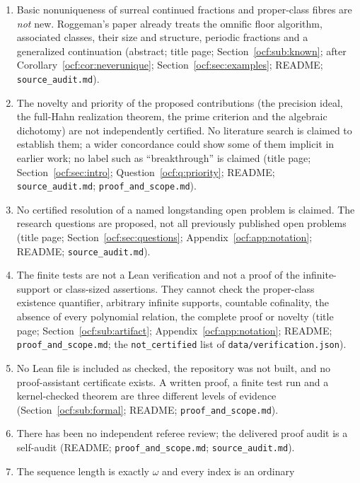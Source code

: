 \documentclass[11pt,a4paper]{article}
\numberwithin{equation}{section}
\theoremstyle{definition}
\theoremstyle{remark}
\newcommand{\rpath}[1]{\nolinkurl{#1}}%
\begin{document}
\begin{enumerate}[label=S\arabic*.,leftmargin=2.6em,itemsep=2pt]
\item Basic nonuniqueness of surreal continued fractions and proper-class
fibres are \emph{not} new. Roggeman's paper \cite{Roggeman} already treats
the omnific floor algorithm, associated classes, their size and structure,
periodic fractions and a generalized continuation (abstract; title page;
Section~\ref{ocf:sub:known}; after Corollary~\ref{ocf:cor:neverunique};
Section~\ref{ocf:sec:examples}; README; \rpath{source\_audit.md}).
\item The novelty and priority of the proposed contributions (the precision
ideal, the full-Hahn realization theorem, the prime criterion and the
algebraic dichotomy) are not independently certified. No literature search
is claimed to establish them; a wider concordance could show some of them
implicit in earlier work; no label such as ``breakthrough'' is claimed
(title page; Section~\ref{ocf:sec:intro}; Question~\ref{ocf:q:priority};
README; \rpath{source\_audit.md}; \rpath{proof\_and\_scope.md}).
\item No certified resolution of a named longstanding open problem is
claimed. The research questions are proposed, not all previously
published open problems (title page; Section~\ref{ocf:sec:questions};
Appendix~\ref{ocf:app:notation}; README; \rpath{source\_audit.md}).
\item The finite tests are not a Lean verification and not a proof of the
infinite-support or class-sized assertions. They cannot check the
proper-class existence quantifier, arbitrary infinite supports, countable
cofinality, the absence of every polynomial relation, the complete proof or
novelty (title page; Section~\ref{ocf:sub:artifact};
Appendix~\ref{ocf:app:notation}; README; \rpath{proof\_and\_scope.md};
the \texttt{not\_certified} list of \rpath{data/verification.json}).
\item No Lean file is included as checked, the repository was not built,
and no proof-assistant certificate exists. A written proof, a finite test
run and a kernel-checked theorem are three different levels of evidence
(Section~\ref{ocf:sub:formal}; README; \rpath{proof\_and\_scope.md}).
\item There has been no independent referee review; the delivered proof audit
is a self-audit (README; \rpath{proof\_and\_scope.md};
\rpath{source\_audit.md}).
\item The sequence length is exactly $\omega$ and every index is an ordinary

\end{enumerate}
\end{document}
